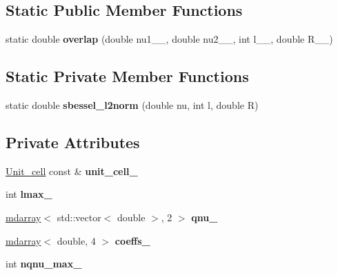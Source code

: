 \subsection*{Static Public Member Functions}
\begin{DoxyCompactItemize}
\item 
\hypertarget{classsirius_1_1sbessel__approx_a5f0a96dcaab8607b8a2ee343480e4c55}{}static double {\bfseries overlap} (double nu1\+\_\+\+\_\+, double nu2\+\_\+\+\_\+, int l\+\_\+\+\_\+, double R\+\_\+\+\_\+)\label{classsirius_1_1sbessel__approx_a5f0a96dcaab8607b8a2ee343480e4c55}

\end{DoxyCompactItemize}
\subsection*{Static Private Member Functions}
\begin{DoxyCompactItemize}
\item 
\hypertarget{classsirius_1_1sbessel__approx_a1b64770f4476bc377ecb692a5173d567}{}static double {\bfseries sbessel\+\_\+l2norm} (double nu, int l, double R)\label{classsirius_1_1sbessel__approx_a1b64770f4476bc377ecb692a5173d567}

\end{DoxyCompactItemize}
\subsection*{Private Attributes}
\begin{DoxyCompactItemize}
\item 
\hypertarget{classsirius_1_1sbessel__approx_af504ada4b294644ecb962e4414bc1dc9}{}\hyperlink{classsirius_1_1_unit__cell}{Unit\+\_\+cell} const \& {\bfseries unit\+\_\+cell\+\_\+}\label{classsirius_1_1sbessel__approx_af504ada4b294644ecb962e4414bc1dc9}

\item 
\hypertarget{classsirius_1_1sbessel__approx_a5e64b49c618586d5753106bf8db99a78}{}int {\bfseries lmax\+\_\+}\label{classsirius_1_1sbessel__approx_a5e64b49c618586d5753106bf8db99a78}

\item 
\hypertarget{classsirius_1_1sbessel__approx_a19f4f9b86cfc5c5616225f91d640d072}{}\hyperlink{classsddk_1_1mdarray}{mdarray}$<$ std\+::vector$<$ double $>$, 2 $>$ {\bfseries qnu\+\_\+}\label{classsirius_1_1sbessel__approx_a19f4f9b86cfc5c5616225f91d640d072}

\item 
\hypertarget{classsirius_1_1sbessel__approx_a333a901f348c9e55c6283fa118c1f465}{}\hyperlink{classsddk_1_1mdarray}{mdarray}$<$ double, 4 $>$ {\bfseries coeffs\+\_\+}\label{classsirius_1_1sbessel__approx_a333a901f348c9e55c6283fa118c1f465}

\item 
\hypertarget{classsirius_1_1sbessel__approx_a0f3c49044c9a319233444092006876ba}{}int {\bfseries nqnu\+\_\+max\+\_\+}\label{classsirius_1_1sbessel__approx_a0f3c49044c9a319233444092006876ba}

\end{DoxyCompactItemize}


